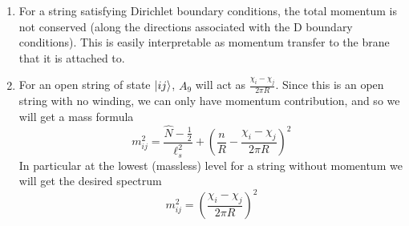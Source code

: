 \documentclass[11pt, class=article, crop=false]{standalone}
\begin{document}
\begin{enumerate}
	\item For a string satisfying Dirichlet boundary conditions, the total momentum is not conserved (along the directions associated with the D boundary conditions). This is easily interpretable as momentum transfer to the brane that it is attached to.
	
	\item For an open string of state $\ket{ij}$, $A_9$ will act as $\frac{\chi_i - \chi_j}{2\pi R}$. Since this is an open string with no winding, we can only have momentum contribution, and so we will get a mass formula
	\[
		m^2_{ij} = \frac{\hat N - \frac12}{\ell_s^2} + \left(\frac{n}{R} - \frac{\chi_i - \chi_j}{2\pi R} \right)^2
	\]
	In particular at the lowest (massless) level for a string without momentum we will get the desired spectrum
	\[
		m_{ij}^2 =  \left(\frac{\chi_i - \chi_j}{2\pi R} \right)^2
	\]
	

\end{enumerate}
\end{document}
